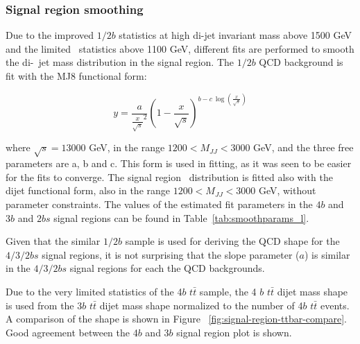 \subsubsection{Signal region smoothing}
\label{sec:boosted-SR-smoothing}

Due to the improved $1/2b$ statistics at high di-\largeR jet invariant mass above 1500 GeV and the limited \ttbar\ statistics above 1100 GeV, different fits are performed to smooth the di-\largeR\ jet mass distribution in the signal region. The $1/2b$ QCD background is fit with the MJ8 functional form:

\begin{equation}
\label{eq:boosted_dijet}
y = \frac{a}{\frac{x}{\sqrt{s}}^2} (1-\frac{x}{\sqrt{s}})^{b - c\ \log(\frac{x}{\sqrt{s}})}
\end{equation}

where $\sqrt{s} = 13000$ GeV, in the range $1200 < M_{JJ} < 3000$ GeV, and the three free parameters are a, b and c. This form is used in fitting, as it was seen to be easier for the fits to converge.  The signal region \ttbar\ distribution is fitted also with the dijet functional form, also in the range $1200 < M_{JJ} < 3000$ GeV, without parameter constraints. The values of the estimated fit parameters in the $4b$ and $3b$ and $2bs$ signal regions can be found in Table~\ref{tab:smoothparams_l}.

Given that the similar $1/2b$ sample is used for deriving the QCD shape for the $4/3/2bs$  signal regions, it is not surprising that the slope parameter ($a$) is similar in  the  $4/3/2bs$  signal regions for each the QCD backgrounds.

Due to the very limited statistics of the 4$b$ $t\bar{t}$ sample, the 4 $b$ $t\bar{t}$ dijet mass shape is used from the 3$b$ $t\bar{t}$ dijet mass shape normalized to the number of 4$b$ $t\bar{t}$ events. A comparison of the shape is shown in Figure ~\ref{fig:signal-region-ttbar-compare}. Good agreement between the 4$b$ and 3$b$ signal region plot is shown.

